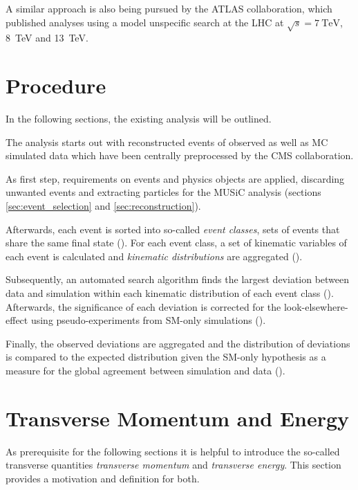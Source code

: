 A similar approach is also being pursued by the \ac{ATLAS} collaboration, which published analyses using a model unspecific search at the \ac{LHC} at $\sqrt{s} = \SI{7}{\TeV}$\cite{ATLAS:ATLAS-CONF-2012-107}, \SI{8}{\TeV}\cite{ATLAS:ATLAS-CONF-2014-006} and \SI{13}{\TeV}\cite{ATLAS:ATLAS-CONF-2017-001}.

\pagebreak

\section{Procedure}
In the following sections, the existing analysis will be outlined.

The analysis starts out with reconstructed events of observed as well as \ac{MC} simulated data which have been centrally preprocessed by the \ac{CMS} collaboration.

As first step, requirements on events and physics objects are applied, discarding unwanted events and extracting particles for the \ac{MUSiC} analysis (sections \ref{sec:event_selection} and \ref{sec:reconstruction}).

Afterwards, each event is sorted into so-called \emph{event classes}, sets of events that share the same final state ().
For each event class, a set of kinematic variables of each event is calculated and \emph{kinematic distributions} are aggregated ().

Subsequently, an automated search algorithm finds the largest deviation between data and simulation within each kinematic distribution of each event class (). Afterwards, the significance of each deviation is corrected for the look-elsewhere-effect using pseudo-experiments from \ac{SM}-only simulations (). 

Finally, the observed deviations are aggregated and the distribution of deviations is compared to the expected distribution given the \ac{SM}-only hypothesis as a measure for the global agreement between simulation and data ().

\section{Transverse Momentum and Energy}
\label{sec:transverse_quantities}

As prerequisite for the following sections it is helpful to introduce the so-called transverse quantities \emph{transverse momentum} and \emph{transverse energy}. This section provides a motivation and definition for both.

